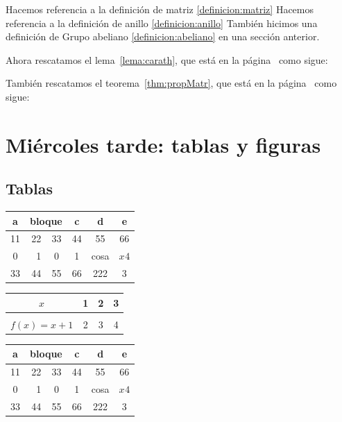 \documentclass[10pt,a4paper]{article}
\begin{document}
Hacemos referencia a la definición de matriz \ref{definicion:matriz}
Hacemos referencia a la definición de anillo \ref{definicion:anillo}
También hicimos una definición de Grupo abeliano \ref{definicion:abeliano} en una sección anterior.

Ahora rescatamos el lema~\ref{lema:carath}, que está en la página~\pageref{lema:carath} como sigue:
\carath*

También rescatamos el teorema~\ref{thm:propMatr}, que está en la página~\pageref{thm:propMatr} como sigue:
\propMatr*

\section[Tablas y figuras]{Miércoles tarde: tablas y figuras}

\subsection{Tablas}
\begin{center}

	\begin{tabular}{|c|r|c|c|cc|}
	\hline
	a & \multicolumn{2}{r|}{bloque} & c & d & e \\
	\hline
	11 & 22 & 33 & 44 & 55 & 66 \\
	
	0 & 1 & 0 & 1 & cosa & $x^{}4$ \\
	\hline
	33 & 44 & 55 & 66 & 222 & 3 \\
	\hline
	\end{tabular}
\end{center}

\begin{center}
	\begin{tabular}{c|ccc}
		
		$x$ & 1 & 2 & 3 \\
		\hline \\ [-0.2cm]
		$f(x)=x+1$ & 2 & 3 & 4 \\
		
	\end{tabular}
\end{center}

\begin{center}
	\renewcommand{\arraystretch}{2}
	\begin{tabular}{|c|r|c|c|c|c|}
		\hline
		a & \multicolumn{2}{r|}{bloque} & c & d & e \\
		\hline
		11 & 22 & 33 & 44 & 55 & 66 \\ 
		\hline
		0 & 1 & 0 & 1 & cosa & $x^{}4$ \\
		\hline
		33 & 44 & 55 & 66 & 222 & 3 \\
		\hline
	\end{tabular}
\end{center}
\end{document}
